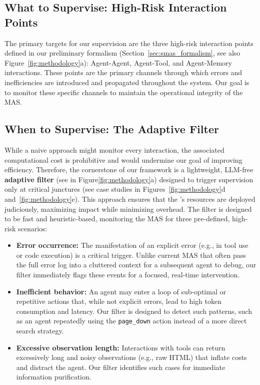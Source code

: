 \subsection{What to Supervise: High-Risk Interaction Points}
The primary targets for our supervision are the three high-risk interaction points defined in our preliminary formalism (Section~\ref{sec:smas_formalism}, see also Figure~\ref{fig:methodology}a): Agent-Agent, Agent-Tool, and Agent-Memory interactions. These points are the primary channels through which errors and inefficiencies are introduced and propagated throughout the system. Our goal is to monitor these specific channels to maintain the operational integrity of the MAS.

\subsection{When to Supervise: The Adaptive Filter}
While a naive approach might monitor every interaction, the associated computational cost is prohibitive and would undermine our goal of improving efficiency.
Therefore, the cornerstone of our framework is a lightweight, LLM-free \textbf{adaptive filter} (see in Figure\ref{fig:methodology}a) designed to trigger supervision only at critical junctures (see case studies in Figures~\ref{fig:methodology}d and~\ref{fig:methodology}e).
This approach ensures that the \method's resources are deployed judiciously, maximizing impact while minimizing overhead.
The filter is designed to be fast and heuristic-based, monitoring the MAS for three pre-defined, high-risk scenarios:
\begin{itemize}[nosep, leftmargin=12pt]
    \item \textbf{Error occurrence:}
          The manifestation of an explicit error (e.g., in tool use or code execution) is a critical trigger.
          Unlike current MAS that often pass the full error log into a cluttered context for a subsequent agent to debug, our filter immediately flags these events for a focused, real-time intervention.

    \item \textbf{Inefficient behavior:}
          An agent may enter a loop of sub-optimal or repetitive actions that, while not explicit errors, lead to high token consumption and latency.
          Our filter is designed to detect such patterns, such as an agent repeatedly using the \texttt{page\_down} action instead of a more direct search strategy.

    \item \textbf{Excessive observation length:}
          Interactions with tools can return excessively long and noisy observations (e.g., raw HTML) that inflate costs and distract the agent.
          Our filter identifies such cases for immediate information purification.
\end{itemize}



